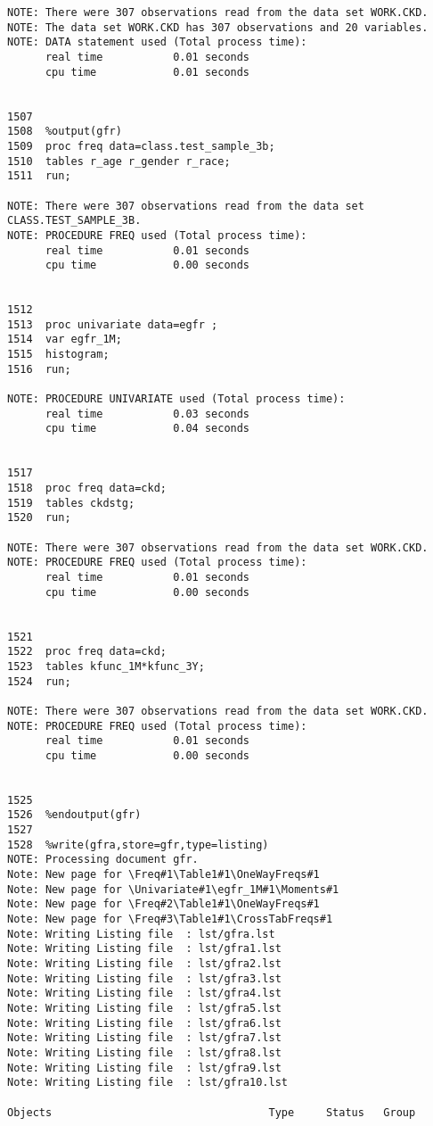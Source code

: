 \documentclass{article}\usepackage[]{graphicx}\usepackage[]{color}
\begin{document}
\begin{verbatim}
NOTE: There were 307 observations read from the data set WORK.CKD.
NOTE: The data set WORK.CKD has 307 observations and 20 variables.
NOTE: DATA statement used (Total process time):
      real time           0.01 seconds
      cpu time            0.01 seconds


1507
1508  %output(gfr)
1509  proc freq data=class.test_sample_3b;
1510  tables r_age r_gender r_race;
1511  run;

NOTE: There were 307 observations read from the data set CLASS.TEST_SAMPLE_3B.
NOTE: PROCEDURE FREQ used (Total process time):
      real time           0.01 seconds
      cpu time            0.00 seconds


1512
1513  proc univariate data=egfr ;
1514  var egfr_1M;
1515  histogram;
1516  run;

NOTE: PROCEDURE UNIVARIATE used (Total process time):
      real time           0.03 seconds
      cpu time            0.04 seconds


1517
1518  proc freq data=ckd;
1519  tables ckdstg;
1520  run;

NOTE: There were 307 observations read from the data set WORK.CKD.
NOTE: PROCEDURE FREQ used (Total process time):
      real time           0.01 seconds
      cpu time            0.00 seconds


1521
1522  proc freq data=ckd;
1523  tables kfunc_1M*kfunc_3Y;
1524  run;

NOTE: There were 307 observations read from the data set WORK.CKD.
NOTE: PROCEDURE FREQ used (Total process time):
      real time           0.01 seconds
      cpu time            0.00 seconds


1525
1526  %endoutput(gfr)
1527
1528  %write(gfra,store=gfr,type=listing)
NOTE: Processing document gfr.
Note: New page for \Freq#1\Table1#1\OneWayFreqs#1
Note: New page for \Univariate#1\egfr_1M#1\Moments#1
Note: New page for \Freq#2\Table1#1\OneWayFreqs#1
Note: New page for \Freq#3\Table1#1\CrossTabFreqs#1
Note: Writing Listing file  : lst/gfra.lst
Note: Writing Listing file  : lst/gfra1.lst
Note: Writing Listing file  : lst/gfra2.lst
Note: Writing Listing file  : lst/gfra3.lst
Note: Writing Listing file  : lst/gfra4.lst
Note: Writing Listing file  : lst/gfra5.lst
Note: Writing Listing file  : lst/gfra6.lst
Note: Writing Listing file  : lst/gfra7.lst
Note: Writing Listing file  : lst/gfra8.lst
Note: Writing Listing file  : lst/gfra9.lst
Note: Writing Listing file  : lst/gfra10.lst

Objects                                  Type     Status   Group


\end{verbatim}
\end{document}
